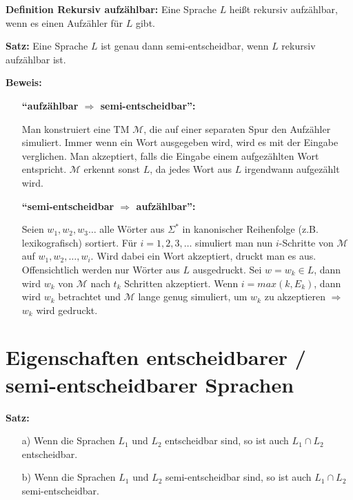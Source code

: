 \documentclass{scrartcl}%
\begin{document}
    \vspace*{0.3cm}
    \textbf{\textsf{Definition Rekursiv aufzählbar:}}
    Eine Sprache $L$ heißt rekursiv aufzählbar, wenn es einen Aufzähler für $L$ gibt.

    \vspace*{0.3cm}
    \textbf{\textsf{Satz:}}
    Eine Sprache $L$ ist genau dann semi-entscheidbar, wenn $L$ rekursiv aufzählbar ist.

    \vspace*{0.3cm}
    \textbf{\textsf{Beweis:}}
    \begin{itemize}
        \item [] \textbf{"`aufzählbar $\Rightarrow$ semi-entscheidbar"':}
        \item [] Man konstruiert eine TM $\mathcal{M}$, die auf einer separaten Spur den Aufzähler simuliert.
        Immer wenn ein Wort ausgegeben wird, wird es mit der Eingabe verglichen.
        Man akzeptiert, falls die Eingabe einem aufgezählten Wort entspricht.
        $\mathcal{M}$ erkennt sonst $L$, da jedes Wort aus $L$ irgendwann aufgezählt wird.
        \item [] \textbf{"`semi-entscheidbar $\Rightarrow$ aufzählbar"':}
        \item [] Seien $w_1, w_2, w_3 \dots$ alle Wörter aus $\Sigma^*$ in kanonischer Reihenfolge (z.B. lexikografisch) sortiert.
        Für $i = 1,2,3, \dots$ simuliert man nun $i$-Schritte von $\mathcal{M}$ auf $w_1, w_2, \dots, w_i$.
        Wird dabei ein Wort akzeptiert, druckt man es aus.
        Offensichtlich werden nur Wörter aus $L$ ausgedruckt.
        Sei $w=w_k \in L$, dann wird $w_k$ von $\mathcal{M}$ nach $t_k$ Schritten akzeptiert.
        Wenn $i = max(k, E_k)$, dann wird $w_k$ betrachtet und $\mathcal{M}$ lange genug simuliert, um $w_k$ zu akzeptieren
        $\Rightarrow$ $w_k$ wird gedruckt.\proofend
    \end{itemize}

    \section*{Eigenschaften entscheidbarer / semi-entscheidbarer Sprachen}
    \textbf{\textsf{Satz:}}
    \begin{itemize}
        \item [a)] Wenn die Sprachen $L_1$ und $L_2$ entscheidbar sind, so ist auch $L_1 \cap L_2$ entscheidbar.
        \item [b)] Wenn die Sprachen $L_1$ und $L_2$ semi-entscheidbar sind, so ist auch $L_1 \cap L_2$ semi-entscheidbar.
    \end{itemize}
\end{document}
